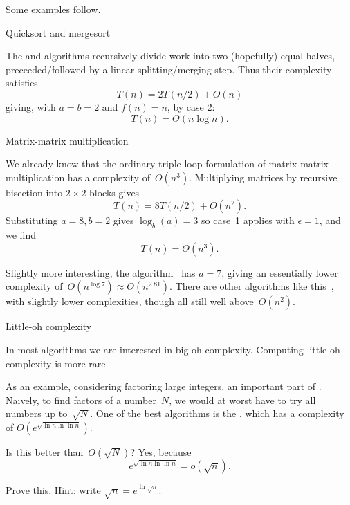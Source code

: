 Some examples follow.

 {Quicksort and mergesort}

The  and  algorithms
recursively divide work into two (hopefully) equal halves,
preceeded/followed by a linear splitting/merging step.
Thus their complexity satisfies
\[ T(n) = 2T(n/2) + O(n) \]
giving, with $a=b=2$ and $f(n)=n$, by case 2:
\[ T(n) = \Theta( n\log n ). \]

 {Matrix-matrix multiplication}

We already know that the ordinary triple-loop formulation of
matrix-matrix multiplication has a complexity of~$O(n^3)$.
Multiplying matrices by recursive bisection into $2\times 2$ blocks
gives
\[ T(n) = 8T(n/2) + O(n^2). \]
Substituting $a=8,b=2$ gives $\log_b(a)=3$
so case~1 applies with $\epsilon=1$,
and we find
\[ T(n) = \Theta( n^3 ). \]

Slightly more interesting, the
algorithm~\cite{St:gaussnotoptimal}
has $a=7$,
giving an essentially lower complexity of~$O(n^{\log 7}) \approx O(n^{2.81})$.
There are other algorithms like this~\cite{Pa:combinations},
with slightly lower complexities,
though all still well above~$O(n^2)$.

 {Little-oh complexity}

In most algorithms we are interested in big-oh complexity.
Computing little-oh complexity is more rare.

As an example, considering factoring large integers,
an important part of .
Naively, to find factors of a number~$N$,
we would at worst have to try all numbers up to~$\sqrt N$.
One of the best algorithms is the ,
which has a complexity of $O( e^{ \sqrt{ \ln n \ln \ln n } } )$.

Is this better than~$O(\sqrt N)$? Yes, because
\[ e^{ \sqrt{ \ln n \ln \ln n } } = o( \sqrt n ). \]
\begin{exercise}
  Prove this. Hint: write $\sqrt n=e^{\ln \sqrt n}$.
\end{exercise}

